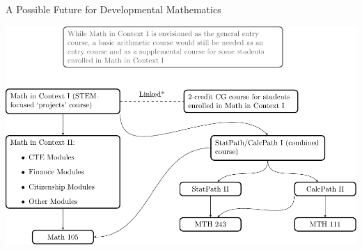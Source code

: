 \documentclass{beamer}
\begin{document}
 
\begin{frame}{A Possible Future for Developmental Mathematics}



\includegraphics[width=\textwidth]{graphics/pathwayDiagram.pdf}



\end{frame}

\end{document}
